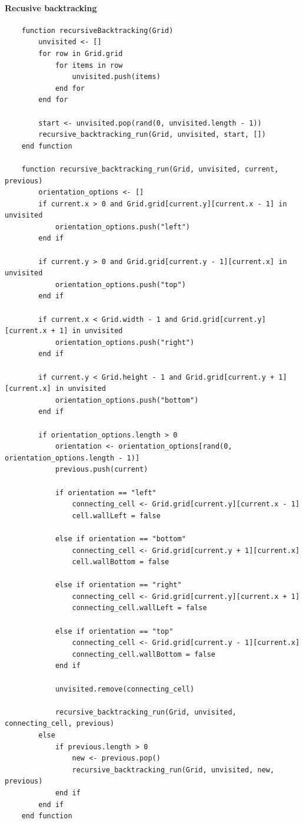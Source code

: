 \documentclass{article}
\begin{document}
\paragraph{Recusive backtracking}
\begin{verbatim}
    function recursiveBacktracking(Grid)
        unvisited <- []
        for row in Grid.grid
            for items in row
                unvisited.push(items)
            end for
        end for

        start <- unvisited.pop(rand(0, unvisited.length - 1))
        recursive_backtracking_run(Grid, unvisited, start, [])
    end function

    function recursive_backtracking_run(Grid, unvisited, current, previous)
        orientation_options <- []
        if current.x > 0 and Grid.grid[current.y][current.x - 1] in unvisited
            orientation_options.push("left")
        end if

        if current.y > 0 and Grid.grid[current.y - 1][current.x] in unvisited
            orientation_options.push("top")
        end if

        if current.x < Grid.width - 1 and Grid.grid[current.y][current.x + 1] in unvisited
            orientation_options.push("right")
        end if

        if current.y < Grid.height - 1 and Grid.grid[current.y + 1][current.x] in unvisited
            orientation_options.push("bottom")
        end if

        if orientation_options.length > 0
            orientation <- orientation_options[rand(0, orientation_options.length - 1)]
            previous.push(current)

            if orientation == "left"
                connecting_cell <- Grid.grid[current.y][current.x - 1]
                cell.wallLeft = false
            
            else if orientation == "bottom"
                connecting_cell <- Grid.grid[current.y + 1][current.x]
                cell.wallBottom = false
            
            else if orientation == "right"
                connecting_cell <- Grid.grid[current.y][current.x + 1]
                connecting_cell.wallLeft = false
            
            else if orientation == "top"
                connecting_cell <- Grid.grid[current.y - 1][current.x]
                connecting_cell.wallBottom = false
            end if

            unvisited.remove(connecting_cell)

            recursive_backtracking_run(Grid, unvisited, connecting_cell, previous)
        else
            if previous.length > 0
                new <- previous.pop()
                recursive_backtracking_run(Grid, unvisited, new, previous)
            end if
        end if
    end function
\end{verbatim}
\end{document}
